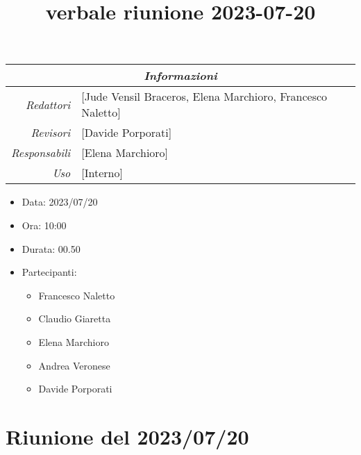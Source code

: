 \documentclass[12pt]{article}
\begin{document}
\graphicspath{ {../../templates/img} }

\title{verbale riunione 2023-07-20}

\firstPage
\maketitle

\begin{center}
\begin{tabular}{r | l}
    \multicolumn{2}{c}{\textit{Informazioni}}\\
    \hline
    
        \textit{Redattori} &
        [Jude Vensil Braceros, Elena Marchioro, Francesco Naletto]\makecell{}\\
    
        \textit{Revisori} &
        [Davide Porporati]\makecell{}\\
        \textit{Responsabili} &
        [Elena Marchioro]\makecell{}\\
            \textit{Uso} & 
            [Interno]\makecell{}\\
\end{tabular}
    \begin{itemize}
    \item[] Data: 2023/07/20
    \item[] Ora: 10:00
    \item[] Durata: 00.50
    \item[] Partecipanti:
    \begin{itemize}
    \item[] Francesco Naletto
    \item[] Claudio Giaretta
    \item[] Elena Marchioro
    \item[] Andrea Veronese
    \item[] Davide Porporati
    \end{itemize}
\end{itemize}
\end{center}


\tableofcontents
\printindex 
\section{Riunione del 2023/07/20}
\end{document}
